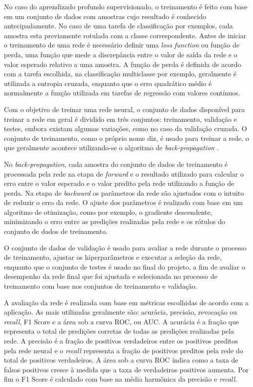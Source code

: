 No caso do aprendizado profundo supervisionado, o treinamento é feito com base em um conjunto de dados com amostras cujo resultado é conhecido antecipadamente. No caso de uma tarefa de classificação por exemplos, cada amostra esta previamente rotulada com a classe correspondente. Antes de iniciar o treinamento de uma rede é necessário definir uma \textit{loss function} ou função de perda, uma função que mede a discrepância entre o valor de saída da rede e o valor esperado relativo a uma amostra. A função de perda é definida de acordo com a tarefa escolhida, na classificação multiclasse por exemplo, geralmente é utilizada a entropia cruzada, enquanto que o erro quadrático médio é normalmente a função utilizada em tarefas de regressão com valores contínuos. 

Com o objetivo de treinar uma rede neural, o conjunto de dados disponível para treinar a rede em geral é dividido em três conjuntos:  treinamento, validação e testes, embora existam algumas variações, como no caso da validação cruzada.  O conjunto de treinamento, como o próprio nome diz, é usado para treinar a rede, o que geralmente acontece utilizando-se o algoritmo de \textit{back-propagation} \cite{Rumelhart1986}.

No \textit{back-propagation}, cada amostra do conjunto de dados de treinamento é processada pela rede na etapa de \textit{forward} e o resultado utilizado para calcular o erro entre o valor esperado e o valor predito pela rede utilizando a função de perda. Na etapa de \textit{backward} os parâmetros da rede são ajustados com o intuito de reduzir o erro da rede. O ajuste dos parâmetros é realizado com base em um algoritmo de otimização, como por exemplo, o gradiente descendente, minimizando o erro entre as predições realizadas pela rede e os rótulos do conjunto de dados de treinamento.

O conjunto de dados de validação é usado para avaliar a rede durante o processo de treinamento, ajustar os hiperparâmetros e executar a seleção da rede, enquanto que o conjunto de testes é usado no final do projeto, a fim de avaliar o desempenho da rede final que foi ajustada e selecionada no processo de treinamento com base nos conjuntos de treinamento e validação.

A avaliação da rede é realizada com base em métricas escolhidas de acordo com a aplicação. As mais utilizadas geralmente são: acurácia, precisão, revocação ou \textit{recall}, F1 Score e a área sob a curva ROC, ou AUC. A acurácia é a fração que representa o total de predições corretas de todas as predições realizadas pela rede. A precisão é a fração de positivos verdadeiros entre os positivos preditos pela rede neural e o \textit{recall} representa a fração de positivos preditos pela rede do total de positivos verdadeiros. A área sob a curva ROC indica como a taxa de falsos positivos cresce à medida que a taxa de verdadeiros positivos aumenta. Por fim o F1 Score é calculado com base na média harmônica da precisão e \textit{recall}.

